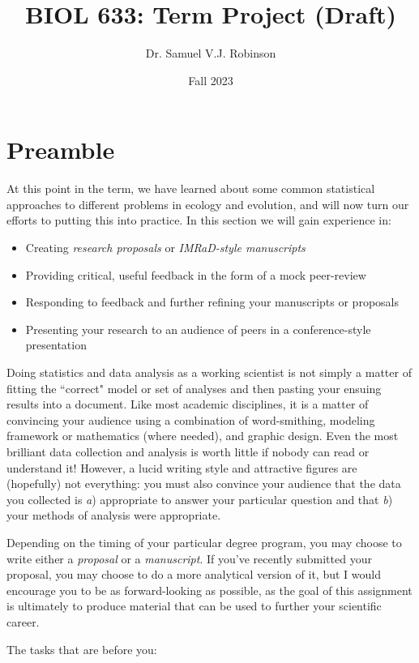 \documentclass[11pt]{article}
\title{BIOL 633: Term Project (Draft)}
\author{Dr. Samuel V.J. Robinson}
\date{Fall 2023}
\begin{document}
\maketitle

\section*{Preamble}

\large
At this point in the term, we have learned about some common statistical approaches to different problems in ecology and evolution, and will now turn our efforts to putting this into practice. In this section we will gain experience in: 

\begin{itemize}
\item Creating \emph{research proposals} or \emph{IMRaD-style manuscripts} 
\item Providing critical, useful feedback in the form of a mock peer-review
\item Responding to feedback and further refining your manuscripts or proposals
\item Presenting your research to an audience of peers in a conference-style presentation
\end{itemize}

Doing statistics and data analysis as a working scientist is not simply a matter of fitting the ``correct" model or set of analyses and then pasting your ensuing results into a document. Like most academic disciplines, it is a matter of convincing your audience using a combination of word-smithing, modeling framework or mathematics (where needed), and graphic design. Even the most brilliant data collection and analysis is worth little if nobody can read or understand it! However, a lucid writing style and attractive figures are (hopefully) not everything: you must also convince your audience that the data you collected is \emph{a}) appropriate to answer your particular question and that \emph{b}) your methods of analysis were appropriate.

Depending on the timing of your particular degree program, you may choose to write either a \emph{proposal} or a \emph{manuscript}. If you've recently submitted your proposal, you may choose to do a more analytical version of it, but I would encourage you to be as forward-looking as possible, as the goal of this assignment is ultimately to produce material that can be used to further your scientific career.

The tasks that are before you:
\end{document}
